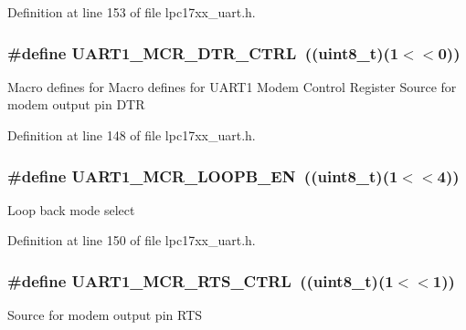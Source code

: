 \-Definition at line 153 of file lpc17xx\-\_\-uart.\-h.

\hypertarget{group___u_a_r_t___private___macros_ga8ca301061bda466b0e62ff182938a19e}{
\subsubsection[{\-U\-A\-R\-T1\-\_\-\-M\-C\-R\-\_\-\-D\-T\-R\-\_\-\-C\-T\-R\-L}]{\setlength{\rightskip}{0pt plus 5cm}\#define {\bf \-U\-A\-R\-T1\-\_\-\-M\-C\-R\-\_\-\-D\-T\-R\-\_\-\-C\-T\-R\-L}~((uint8\-\_\-t)(1$<$$<$0))}}\label{group___u_a_r_t___private___macros_ga8ca301061bda466b0e62ff182938a19e}
\-Macro defines for \-Macro defines for \-U\-A\-R\-T1 \-Modem \-Control \-Register \-Source for modem output pin \-D\-T\-R 

\-Definition at line 148 of file lpc17xx\-\_\-uart.\-h.

\hypertarget{group___u_a_r_t___private___macros_ga2c22f6069fc2d3d621cd8b2e578d69a3}{
\subsubsection[{\-U\-A\-R\-T1\-\_\-\-M\-C\-R\-\_\-\-L\-O\-O\-P\-B\-\_\-\-E\-N}]{\setlength{\rightskip}{0pt plus 5cm}\#define {\bf \-U\-A\-R\-T1\-\_\-\-M\-C\-R\-\_\-\-L\-O\-O\-P\-B\-\_\-\-E\-N}~((uint8\-\_\-t)(1$<$$<$4))}}\label{group___u_a_r_t___private___macros_ga2c22f6069fc2d3d621cd8b2e578d69a3}
\-Loop back mode select 

\-Definition at line 150 of file lpc17xx\-\_\-uart.\-h.

\hypertarget{group___u_a_r_t___private___macros_ga2e84ce056119e87adccff0b8cec560b1}{
\subsubsection[{\-U\-A\-R\-T1\-\_\-\-M\-C\-R\-\_\-\-R\-T\-S\-\_\-\-C\-T\-R\-L}]{\setlength{\rightskip}{0pt plus 5cm}\#define {\bf \-U\-A\-R\-T1\-\_\-\-M\-C\-R\-\_\-\-R\-T\-S\-\_\-\-C\-T\-R\-L}~((uint8\-\_\-t)(1$<$$<$1))}}\label{group___u_a_r_t___private___macros_ga2e84ce056119e87adccff0b8cec560b1}
\-Source for modem output pin \-R\-T\-S 

